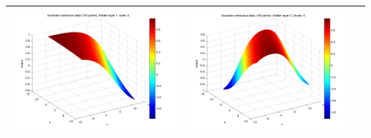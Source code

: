 \documentclass[fleqn]{article}
\begin{document}
\begin{center}
\begin{longtable}{ c | c | r }
    \includegraphics[scale=0.25]{./pics/bivariate100/_2_4/_2_4_epoch_50_hidden layer 1 :2} &   \includegraphics[scale=0.25]{./pics/bivariate100/_2_4/_2_4_epoch_50_hidden layer 2 :24} & \\
   \hline
  \end{longtable}
\end{center}
\end{document}
